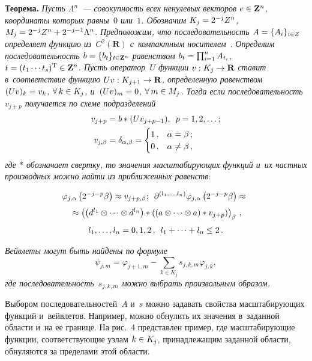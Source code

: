 \begin{multicols}{2}
\noindent
\textbf{Теорема.} \textit{Пусть $\Lambda^n$~--- совокупность всех ненулевых 
векторов $e\hm\in \mathbf{Z}^n$, координаты которых равны~$0$ или~$1$. 
Обозначим $K_j\hm= 2^{-j} Z^n$, $M_j\hm= 2^{-j} Z^n\hm+ 2^{-j-1} \Lambda^n$. 
Предположим, что по\-сле\-до\-ва\-тель\-ность $A\hm= \{A_i\}_{i\in Z}$ определяет 
функцию из~$C^2(\mathbf{R})$ с~компактным носителем}~\cite{4-bos}. \textit{Определим 
последовательность $b\hm= \{b_t\}_{t\in \mathbf{Z}^n}$ равенством $b_t\hm= 
\prod\nolimits^n_{i=1} A_{t_i}$, $t\hm= (t_1\cdots t_s)^{\mathrm{T}} \hm\in \mathbf{Z}^n$. Пусть 
оператор~$U$ функции $v: K_j\hm\to \mathbf{R}$ ставит в~соответствие 
функцию $Uv: K_{j+1}\hm\to \mathbf{R}$, определенную равенством $(Uv)_k\hm= 
v_k$, $\forall\,k\hm\in K_j$, и~$(Uv)_m\hm=0$, $\forall\,m\hm\in M_j$. Тогда если 
по\-сле\-до\-ва\-тель\-ность~$v_{j+p}$ получается по схеме подразделений 
\begin{align*}
v_{j+p}&= b* (Uv_{j+p-1}),\enskip p= 1,2,\ldots;
\\
v_{j,\beta} &= \delta_{\alpha,\beta} =
\begin{cases}
1\,, & \alpha=\beta\,;\\
0\,, & \alpha\not= \beta\,,
\end{cases}
\end{align*}
где $*$ обозначает свертку, то значения мас\-шта\-би\-ру\-ющих функций и~их 
част\-ных производных мож\-но найти из при\-бли\-жен\-ных равенств}:

\noindent
\begin{multline*}
\!\varphi_{j,\alpha}\left( 2^{-j-p}\beta\right) \approx v_{j+p,\beta};\enskip \partial^{(l_1,\ldots 
,l_n)} \varphi_{j,\alpha} \left( 2^{-j-p}\beta\right)\approx{}\\[3pt]
{}\approx
\left( \left( d^{l_1}\otimes \cdots \otimes d^{l_n}\right) * \left( \left( a\otimes \cdots 
\otimes a\right) * v_{j+p}\right)\right)_\beta\,,\\[3pt]
l_1,\ldots , l_n=0,1,2\,,\enskip l_1+\cdots+ l_n\leq 2\,.
\end{multline*}

\textit{Вейвлеты могут быть найдены по формуле
$$
\psi_{j,m}= \varphi_{j+1,m}- \sum\limits_{k\in K_j} s_{j,k,m} \varphi_{j,k},
$$
где 
по\-сле\-до\-ва\-тель\-ность~$s_{j,k,m}$ мож\-но выбрать произвольным образом.}

\smallskip

  Выбором последовательностей~$A$ и~$s$ мож\-но задавать свойства 
мас\-шта\-би\-ру\-ющих функций и~вейв\-ле\-тов. Например, можно обнулить их значения 
в~заданной об\-ласти и~на ее границе. На рис.~4 представлен пример, где 
мас\-шта\-би\-ру\-ющие функции, соответствующие узлам $k\hm\in K_j$, 
принадлежащим заданной об\-ласти, обнуляются за пределами этой об\-ласти.


\end{multicols}
